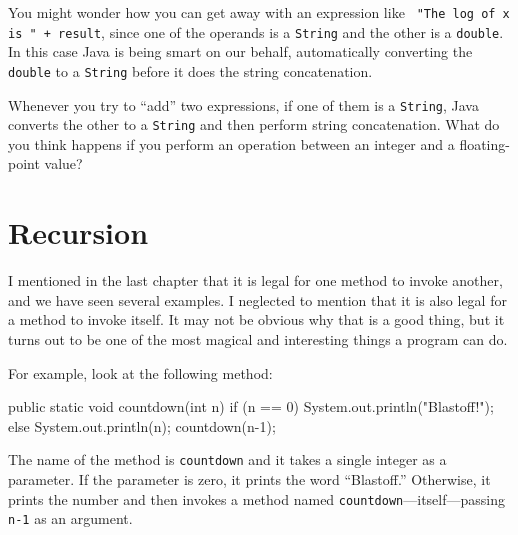 You might wonder how you can get away with an expression like {\tt
"The log of x is " + result}, since one of the operands is a {\tt String}
and the other is a {\tt double}.  In this case Java is being
smart on our behalf, automatically converting the {\tt double} to a
{\tt String} before it does the string concatenation.



Whenever you try to ``add'' two
expressions, if one of them is a {\tt String}, Java converts the
other to a {\tt String} and then perform string concatenation.  What do you
think happens if you perform an operation between an integer and a
floating-point value?


\section{Recursion}
\label{recursion}

I mentioned in the last chapter that it is legal for one method to
invoke another, and we have seen several examples.  I neglected to
mention that it is also legal for a method to invoke itself.  It may
not be obvious why that is a good thing, but it turns out to be one of
the most magical and interesting things a program can do.

For example, look at the following method:

\begin{code}
  public static void countdown(int n) {
    if (n == 0) {
      System.out.println("Blastoff!");
    } else {
      System.out.println(n);
      countdown(n-1);
    }
  }
\end{code}
%
The name of the method is {\tt countdown} and it takes a single
integer as a parameter.  If the parameter is zero, it prints
the word ``Blastoff.''  Otherwise, it prints the number and
then invokes a method named {\tt countdown}---itself---passing
{\tt n-1} as an argument.

